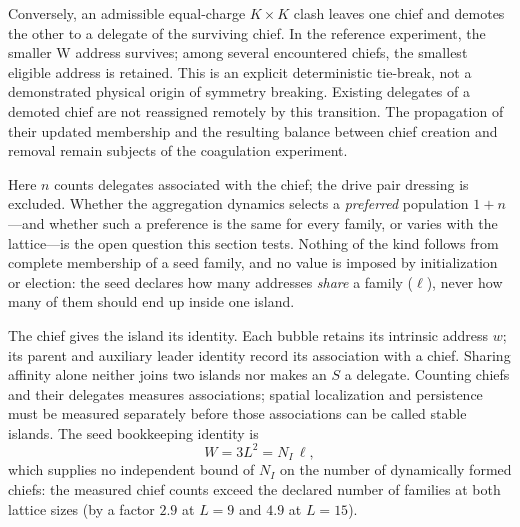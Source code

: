 \documentclass{ijuc}
\begin{document}
Conversely, an admissible equal-charge $K\times K$ clash leaves one chief and demotes the other to a delegate of the surviving chief. In the reference experiment, the smaller W address survives; among several encountered chiefs, the smallest eligible address is retained. This is an explicit deterministic tie-break, not a demonstrated physical origin of symmetry breaking. Existing delegates of a demoted chief are not reassigned remotely by this transition. The propagation of their updated membership and the resulting balance between chief creation and removal remain subjects of the coagulation experiment.

Here $n$ counts delegates associated with the chief; the drive pair dressing is excluded. Whether the aggregation dynamics selects a \emph{preferred} population $1+n$---and whether such a preference is the same for every family, or varies with the lattice---is the open question this section tests. Nothing of the kind follows from complete membership of a seed family, and no value is imposed by initialization or election: the seed declares how many addresses \emph{share} a family ($\ell$), never how many of them should end up inside one island.

The chief gives the island its identity. Each bubble retains its intrinsic address $w$; its parent and auxiliary leader identity record its association with a chief. Sharing affinity alone neither joins two islands nor makes an $S$ a delegate. Counting chiefs and their delegates measures associations; spatial localization and persistence must be measured separately before those associations can be called stable islands. The seed bookkeeping identity is
\begin{equation}
W=3L^2=N_I\,\ell,
\end{equation}
which supplies no independent bound of $N_I$ on the number of dynamically formed chiefs: the measured chief counts exceed the declared number of families at both lattice sizes (by a factor $2.9$ at $L=9$ and $4.9$ at $L=15$).
\end{document}
